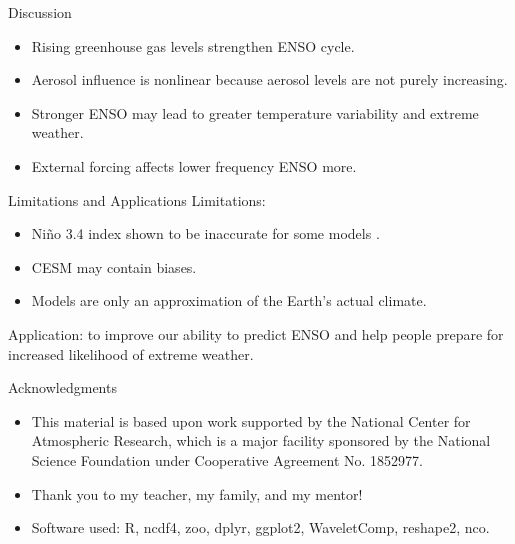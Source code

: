 \documentclass{beamer}
\begin{document}

\begin{frame}{Discussion}
  \begin{itemize}
  \item Rising greenhouse gas levels strengthen ENSO cycle.
  \item Aerosol influence is nonlinear because aerosol levels are not purely increasing.
  \item Stronger ENSO may lead to greater temperature variability and extreme weather.
  \item External forcing affects lower frequency ENSO more.
  \end{itemize}
\end{frame}

\begin{frame}{Limitations and Applications}
  Limitations:
  \begin{itemize}
  \item Niño 3.4 index shown to be inaccurate for some models \citep{cai2018increased}.
  \item CESM may contain biases.
  \item Models are only an approximation of the Earth's actual climate.
  \end{itemize}
  Application: to improve our ability to predict ENSO and help people prepare for increased likelihood of extreme weather.
\end{frame}

\begin{frame}{Acknowledgments}
  \begin{itemize}
  \item This material is based upon work supported by the National Center for Atmospheric Research, which is a major facility sponsored by the National Science Foundation under Cooperative Agreement No. 1852977.
  \item Thank you to my teacher, my family, and my mentor!
  \item Software used: R, ncdf4, zoo, dplyr, ggplot2, WaveletComp, reshape2, nco.
  \end{itemize}
\end{frame}
\end{document}
